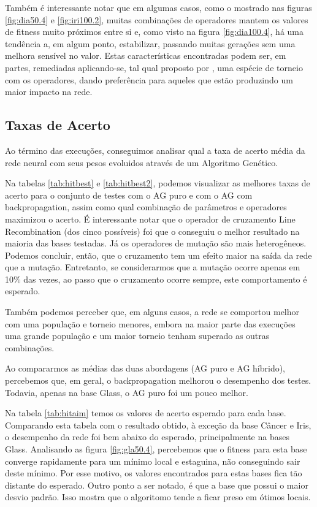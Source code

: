 \documentclass[12pt]{article}
\begin{document}
Também é interessante notar que em algumas casos, como o mostrado nas figuras \ref{fig:dia50.4} e \ref{fig:iri100.2}, muitas combinações de operadores mantem os valores de fitness muito próximos entre si e, como visto na figura \ref{fig:dia100.4}, há uma tendência a, em algum ponto, estabilizar, passando muitas gerações sem uma melhora sensível no valor. Estas características encontradas podem ser, em partes, remediadas aplicando-se, tal qual proposto por \cite{montana}, uma espécie de torneio com os operadores, dando preferência para aqueles que estão produzindo um maior impacto na rede.

\subsection{Taxas de Acerto}

Ao término das execuções, conseguimos analisar qual a taxa de acerto média da rede neural com seus pesos evoluidos através de um Algoritmo Genético.

Na tabelas \ref{tab:hitbest} e \ref{tab:hitbest2}, podemos visualizar as melhores taxas de acerto para o conjunto de testes com o AG puro e com o AG com backpropagation, assim como qual combinação de parâmetros e operadores maximizou o acerto.  É interessante notar que o operador de cruzamento Line Recombination (dos cinco possíveis) foi que o conseguiu o melhor resultado na maioria das bases testadas. Já os operadores de mutação são mais heterogêneos. Podemos concluir, então, que o cruzamento tem um efeito maior na saída da rede que a mutação. Entretanto, se considerarmos que a mutação ocorre apenas em 10\% das vezes, ao passo que o cruzamento ocorre sempre, este comportamento é esperado.

Também podemos perceber que, em alguns casos, a rede se comportou melhor com uma população e torneio menores, embora na maior parte das execuções uma grande população e um maior torneio tenham superado as outras combinações.

Ao compararmos as médias das duas abordagens (AG puro e AG híbrido), percebemos que, em geral, o backpropagation melhorou o desempenho dos testes. Todavia, apenas na base Glass, o AG puro foi um pouco melhor. 

Na tabela \ref{tab:hitaim} temos os valores de acerto esperado para cada base. Comparando esta tabela com o resultado obtido, à exceção da base Câncer e Iris, o desempenho da rede foi bem abaixo do esperado, principalmente na bases Glass. Analisando as figura \ref{fig:gla50.4}, percebemos que o fitness para esta base converge rapidamente para um mínimo local e estaguina, não conseguindo sair deste mínimo. Por esse motivo, os valores encontrados para estas bases fica tão distante do esperado. Outro ponto a ser notado, é que a base que possui o maior desvio padrão. Isso mostra que o algoritomo tende a ficar preso em ótimos locais.
\end{document}
